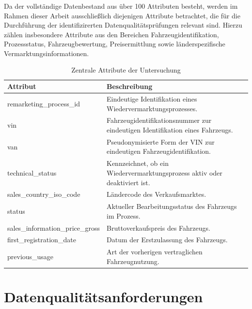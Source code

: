 \documentclass[../main.tex]{subfiles}
\begin{document}
Da der vollständige Datenbestand aus über 100 Attributen besteht, werden im Rahmen dieser Arbeit ausschließlich diejenigen Attribute betrachtet, die für die Durchführung der identifizirerten Datenqualitätsprüfungen relevant sind. Hierzu zählen insbesondere Attribute aus den Bereichen Fahrzeugidentifikation, Prozessstatus, Fahrzeugbewertung, Preisermittlung sowie länderspezifische Vermarktungsinformationen. 

\begin{table}[h]
    \centering
    \caption{Zentrale Attribute der Untersuchung}
    \label{tab:zentrale_attribute}
    \begin{tabular}{p{4.5cm} p{9.5cm}}
    \hline
    \textbf{Attribut} & \textbf{Beschreibung} \\
    \hline
    remarketing\_process\_id & Eindeutige Identifikation eines Wiedervermarktungsprozesses. \\
    vin & Fahrzeugidentifikationsnummer zur eindeutigen Identifikation eines Fahrzeugs. \\
    van & Pseudonymisierte Form der VIN zur eindeutigen Fahrzeugidentifikation. \\
    technical\_status & Kennzeichnet, ob ein Wiedervermarktungsprozess aktiv oder deaktiviert ist. \\
    sales\_country\_iso\_code & Ländercode des Verkaufsmarktes. \\
    status & Aktueller Bearbeitungsstatus des Fahrzeugs im Prozess. \\
    sales\_information\_price\_gross & Bruttoverkaufspreis des Fahrzeugs. \\
    first\_registration\_date & Datum der Erstzulassung des Fahrzeugs. \\
    previous\_usage & Art der vorherigen vertraglichen Fahrzeugnutzung. \\
    \hline
    \end{tabular}
\end{table}

\section{Datenqualitätsanforderungen}
\end{document}
